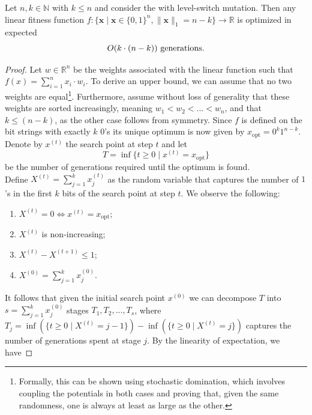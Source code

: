 \begin{theorem} \label{theo:singleOffspring}
    Let $n,k \in \mathbb{N}$ with $k \le n$ and consider the \opoea with level-switch mutation. Then any linear fitness function  $f: \{\mathbf{x}\;|\; \mathbf{x} \in \{0,1\}^n, \| \mathbf{x} \|_1=n-k \} \rightarrow \mathbb{R}$ is optimized in expected  
    \begin{displaymath}
        O(k\cdot (n-k)) \textnormal{ generations.}
    \end{displaymath}
    
\end{theorem}
\begin{proof}
Let $w \in \mathbb{R}^n$ be the weights associated with the linear function such that $f(x) = \sum_{i=1}^n x_i \cdot w_i$. To derive an upper bound, we can assume that no two weights are equal\footnote{Formally, this can be shown using stochastic domination, which involves coupling the potentials in both cases and proving that, given the same randomness, one is always at least as large as the other.}. Furthermore, assume without loss of generality that these weights are sorted increasingly, meaning $w_1 < w_2 < ... < w_n$, and that $k \le (n-k)$, as the other case follows from symmetry. Since $f$ is defined on the bit strings with exactly $k$ 0's its unique optimum is now given by $x_{\text{opt}}=0^{k} 1^{n-k}$. Denote by $x^{(t)}$ the search point at step $t$ and let 
\begin{displaymath}
T = \inf\{ t \geq 0 \mid x^{(t)} = x_{\text{opt}}\}
\end{displaymath}
be the number of generations required until the optimum is found. \\
Define $X^{(t)} = \sum_{j=1}^k x^{(t)}_j$ as the random variable that captures the number of $1$'s in the first $k$ bits of the search point at step $t$. We observe the following:
\begin{enumerate}
    \item $X^{(t)} = 0 \Leftrightarrow x^{(t)} = x_{\text{opt}}$;
    \item $X^{(t)}$ is non-increasing;
    \item $X^{(t)}-X^{(t+1)} \le 1$;
    \item $X^{(0)} = \sum_{j=1}^k x^{(0)}_j$.
\end{enumerate}
It follows that given the initial search point $x^{(0)}$ we can decompose $T$ into $s=\sum_{j=1}^k x^{(0)}_j$ stages $T_1, T_2, ..., T_s$, where $T_j = \inf(\{t \ge 0 \;|\; X^{(t)}=j-1\})- \inf(\{t \ge 0 \;|\; X^{(t)} = j\})$ captures the number of generations spent at stage $j$. By the linearity of expectation, we have

\end{proof}
